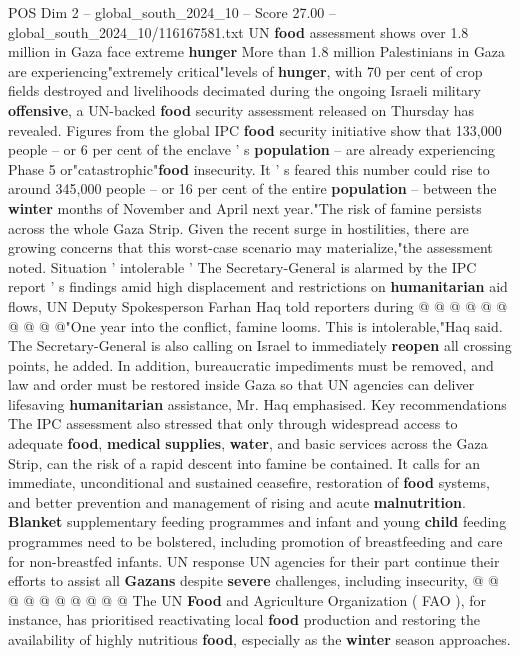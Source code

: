\begin{textsample}{POS Dim 2 – global\_south\_2024\_10 – Score 27.00 – global\_south\_2024\_10/116167581.txt}  \label{ex:f2_pos_139}
UN \textbf{food} assessment shows over 1.8 million in Gaza face extreme \textbf{hunger} More than 1.8 million Palestinians in Gaza are experiencing"extremely critical"levels of \textbf{hunger}, with 70 per cent of crop fields destroyed and livelihoods decimated during the ongoing Israeli military \textbf{offensive}, a UN-backed \textbf{food} security assessment released on Thursday has revealed.
Figures from the global IPC \textbf{food} security initiative show that 133,000 people -- or 6 per cent of the enclave ' s \textbf{population} -- are already experiencing Phase 5 or"catastrophic"\textbf{food} insecurity.
It ' s feared this number could rise to around 345,000 people -- or 16 per cent of the entire \textbf{population} -- between the \textbf{winter} months of November and April next year."The risk of famine persists across the whole Gaza Strip.
Given the recent surge in hostilities, there are growing concerns that this worst-case scenario may materialize,"the assessment noted.
Situation ' intolerable ' The Secretary-General is alarmed by the IPC report ' s findings amid high displacement and restrictions on \textbf{humanitarian} aid flows, UN Deputy Spokesperson Farhan Haq told reporters during @ @ @ @ @ @ @ @ @ @"One year into the conflict, famine looms.
This is intolerable,"Haq said.
The Secretary-General is also calling on Israel to immediately \textbf{reopen} all crossing points, he added.
In addition, bureaucratic impediments must be removed, and law and order must be restored inside Gaza so that UN agencies can deliver lifesaving \textbf{humanitarian} assistance, Mr.
Haq emphasised.
Key recommendations The IPC assessment also stressed that only through widespread access to adequate \textbf{food}, \textbf{medical} \textbf{supplies}, \textbf{water}, and basic services across the Gaza Strip, can the risk of a rapid descent into famine be contained.
It calls for an immediate, unconditional and sustained ceasefire, restoration of \textbf{food} systems, and better prevention and management of rising and acute \textbf{malnutrition}. \textbf{Blanket} supplementary feeding programmes and infant and young \textbf{child} feeding programmes need to be bolstered, including promotion of breastfeeding and care for non-breastfed infants.
UN response UN agencies for their part continue their efforts to assist all \textbf{Gazans} despite \textbf{severe} challenges, including insecurity, @ @ @ @ @ @ @ @ @ @ The UN \textbf{Food} and Agriculture Organization ( FAO ), for instance, has prioritised reactivating local \textbf{food} production and restoring the availability of highly nutritious \textbf{food}, especially as the \textbf{winter} season approaches.

\end{textsample}
